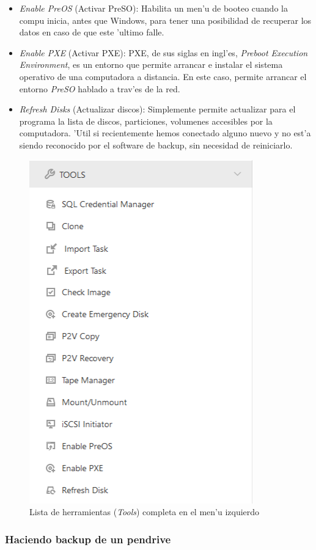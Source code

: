 \documentclass[11pt]{article}
\begin{document}
\begin{itemize}
			\item \textit{Enable PreOS} (Activar PreSO): Habilita un men'u de booteo cuando la compu inicia, antes que Windows, para tener una posibilidad de recuperar los datos en caso de que este 'ultimo falle.
			\item \textit{Enable PXE} (Activar PXE): PXE, de sus siglas en ingl'es, \textit{Preboot Execution Environment}, es un entorno que permite arrancar e instalar el sistema operativo de una computadora a distancia. En este caso, permite arrancar el entorno \textit{PreSO} hablado a trav'es de la red.
			\item \textit{Refresh Disks} (Actualizar discos): Simplemente permite actualizar para el programa la lista de discos, particiones, volumenes accesibles por la computadora. 'Util si recientemente hemos conectado alguno nuevo y no est'a siendo reconocido por el software de backup, sin necesidad de reiniciarlo.
		\end{itemize}
	
		\begin{figure}[H]
			\centering
			\includegraphics[width=.34\textwidth]{Images/easeus/use_tools}
			\caption{Lista de herramientas (\textit{Tools}) completa en el men'u izquierdo}
		\end{figure}

		\subsubsection{Haciendo backup de un pendrive}
		

	
\end{document}
